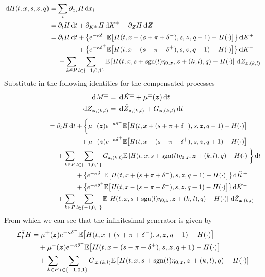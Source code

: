 \begin{align*}
\d H (t,x,s,\bz,q) & = \sum\limits_i \partial_{x_i} H \dx_i \\
& = \partial_t H \dt + \partial_{K^{\pm}} H \d {K^{\pm}} + \partial_{\bZ} H \d {\bZ} \\
& = \partial_t H \dt + \bigl\lbrace e^{ -\kappa \delta^{-}} \E \bigl[ H(t,x+(s+\pi+\delta^-),s,\bz,q-1) - H(\cdot) \bigr] \bigr\rbrace \d K^+\\
& \hphantom{{}={} \partial_t H \dt} + \bigl\lbrace e^{ -\kappa \delta^{+}} \E \bigl[ H(t,x-(s-\pi-\delta^+),s,\bz,q+1) - H(\cdot) \bigr] \bigr\rbrace \d K^-\\
& \hphantom{{}={}} + \sum_{k\in P} \sum_{l \in \{-1,0,1\}} \E \left[ H(t,x,s+\mathrm{sgn}(l)\eta_{0,\bz},\bz+(k,l),q) - H(\cdot) \right] \d Z_{\bz,(k,l)}
\end{align*}
Substitute in the following identities for the compensated processes
\begin{align*} 
\,\mathrm{d} M^{\pm} & = \,\mathrm{d} \tilde{K}^{\pm} + \mu^{\pm}(\bm{z}) \,\mathrm{d}t \\
\,\mathrm{d} Z_{\bm{z},(k,l)}  & = \,\mathrm{d} \tilde{Z}_{\bm{z},(k,l)}  + G_{\bm{z},(k,l)} \,\mathrm{d}t 
\end{align*}
\begin{align*}
{}\phantom{\d H (t,x,s,\bz,q)} & = \partial_t H \dt + \biggl\lbrace \mu^+(\bz) e^{ -\kappa \delta^{-}} \E \bigl[ H(t,x+(s+\pi+\delta^-),s,\bz,q-1) - H(\cdot) \bigr] \\
& \hphantom{{}={} \partial_t H \dt +} + \mu^-(\bz) e^{ -\kappa \delta^{+}} \E \bigl[ H(t,x-(s-\pi-\delta^+),s,\bz,q+1) - H(\cdot) \bigr] \\
& \hphantom{{}={}} + \sum_{k\in P} \sum_{l \in \{-1,0,1\}} G_{\bz,(k,l)} \E \left[ H(t,x,s+\mathrm{sgn}(l)\eta_{0,\bz},\bz+(k,l),q) - H(\cdot) \right]  \biggr\rbrace \dt \\
& \hphantom{{}={} \partial_t H \dt} + \bigl\lbrace e^{ -\kappa \delta^{-}} \E \bigl[ H(t,x+(s+\pi+\delta^-),s,\bz,q-1) - H(\cdot) \bigr] \bigr\rbrace \d \tilde{K}^+\\
& \hphantom{{}={} \partial_t H \dt} + \bigl\lbrace e^{ -\kappa \delta^{+}} \E \bigl[ H(t,x-(s-\pi-\delta^+),s,\bz,q+1) - H(\cdot) \bigr] \bigr\rbrace \d \tilde{K}^-\\
& \hphantom{{}={}} + \sum_{k\in P} \sum_{l \in \{-1,0,1\}} \E \left[ H(t,x,s+\mathrm{sgn}(l)\eta_{0,\bz},\bz+(k,l),q) - H(\cdot) \right] \d \tilde{Z}_{\bz,(k,l)}\
\end{align*}
From which we can see that the infinitesimal generator is given by
\begin{equation}
\label{eq:infgen}
\begin{split}
\mathcal{L}^{\delta}_t H & = \mu^+(\bm{z}) e^{ -\kappa \delta^{-}} \mathbb{E} \bigl[ H(t,x+(s+\pi+\delta^-),s,\bm{z},q-1) - H(\cdot) \bigr] \\
& \quad + \mu^-(\bm{z}) e^{ -\kappa \delta^{+}} \mathbb{E} \bigl[ H(t,x-(s-\pi-\delta^+),s,\bm{z},q+1) - H(\cdot) \bigr] \\
& \quad + \sum_{k\in P} \sum_{l \in \{-1,0,1\}} G_{\bm{z},(k,l)} \mathbb{E} \left[ H(t,x,s+\mathrm{sgn}(l)\eta_{0,\bm{z}},\bm{z}+(k,l),q) - H(\cdot) \right] 
\end{split}
\end{equation}
